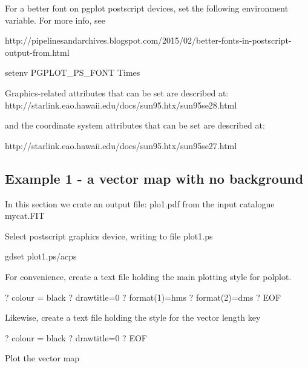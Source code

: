 \begin{tip}
For a better font on pgplot postscript devices, set the
following environment variable. For more info, see

http://pipelinesandarchives.blogspot.com/2015/02/better-fonts-in-postscript-output-from.html

\begin{terminalv}
setenv PGPLOT_PS_FONT Times
\end{terminalv}

Graphics-related attributes that can be set are described at:
http://starlink.eao.hawaii.edu/docs/sun95.htx/sun95se28.html

and the coordinate system attributes that can be set are
described at:

http://starlink.eao.hawaii.edu/docs/sun95.htx/sun95se27.html
\end{tip}



\subsection{ Example 1 - a vector map with no background}
\label{section:kappa-example1}

In this section we crate an output file: plo1.pdf from the input catalogue mycat.FIT

Select postscript graphics device, writing to file plot1.ps

\begin{terminalv}
gdset plot1.ps/acps
\end{terminalv}

For convenience, create a text file holding the main plotting style for polplot. 

\begin{terminalv}
?   colour = black     
?   drawtitle=0        
?   format(1)=hms      
?   format(2)=dms      
? EOF  
\end{terminalv}

Likewise, create a text file holding the style for the vector length key

\begin{terminalv}
?   colour = black
?   drawtitle=0
? EOF
\end{terminalv}


Plot the vector map

\begin{terminalv}
\end{terminalv}

